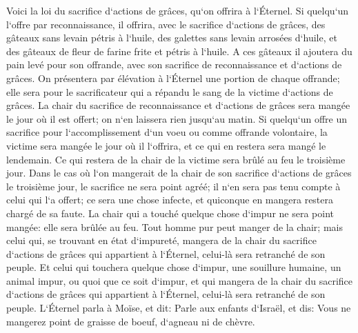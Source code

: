\verse Voici la loi du sacrifice d`actions de grâces, qu`on offrira à l`Éternel. 
\verse Si quelqu`un l`offre par reconnaissance, il offrira, avec le sacrifice d`actions de grâces, des gâteaux sans levain pétris à l`huile, des galettes sans levain arrosées d`huile, et des gâteaux de fleur de farine frite et pétris à l`huile. 
\verse A ces gâteaux il ajoutera du pain levé pour son offrande, avec son sacrifice de reconnaissance et d`actions de grâces. 
\verse On présentera par élévation à l`Éternel une portion de chaque offrande; elle sera pour le sacrificateur qui a répandu le sang de la victime d`actions de grâces. 
\verse La chair du sacrifice de reconnaissance et d`actions de grâces sera mangée le jour où il est offert; on n`en laissera rien jusqu`au matin. 
\verse Si quelqu`un offre un sacrifice pour l`accomplissement d`un voeu ou comme offrande volontaire, la victime sera mangée le jour où il l`offrira, et ce qui en restera sera mangé le lendemain. 
\verse Ce qui restera de la chair de la victime sera brûlé au feu le troisième jour. 
\verse Dans le cas où l`on mangerait de la chair de son sacrifice d`actions de grâces le troisième jour, le sacrifice ne sera point agréé; il n`en sera pas tenu compte à celui qui l`a offert; ce sera une chose infecte, et quiconque en mangera restera chargé de sa faute. 
\verse La chair qui a touché quelque chose d`impur ne sera point mangée: elle sera brûlée au feu. 
\verse Tout homme pur peut manger de la chair; mais celui qui, se trouvant en état d`impureté, mangera de la chair du sacrifice d`actions de grâces qui appartient à l`Éternel, celui-là sera retranché de son peuple. 
\verse Et celui qui touchera quelque chose d`impur, une souillure humaine, un animal impur, ou quoi que ce soit d`impur, et qui mangera de la chair du sacrifice d`actions de grâces qui appartient à l`Éternel, celui-là sera retranché de son peuple. 
\verse L`Éternel parla à Moïse, et dit: 
\verse Parle aux enfants d`Israël, et dis: Vous ne mangerez point de graisse de boeuf, d`agneau ni de chèvre. 
